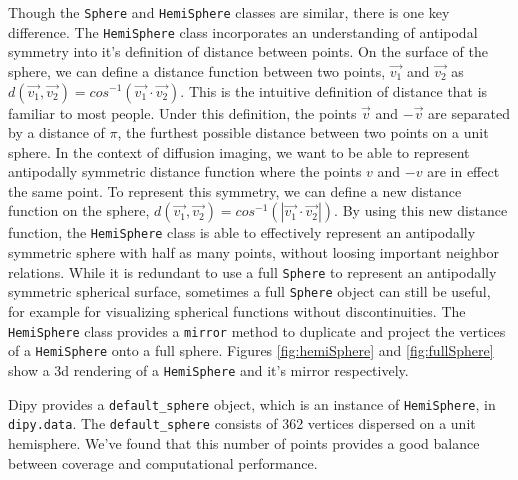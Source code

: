 Though the \verb|Sphere| and \verb|HemiSphere| classes are similar, there is one key difference. The \verb|HemiSphere| class incorporates an understanding of antipodal symmetry into it's definition of distance between points. On the surface of the sphere, we can define a distance function between two points, $\vec{v_1}$ and $\vec{v_2}$ as $d(\vec{v_1}, \vec{v_2}) = cos^{-1}(\vec{v_1} \cdot \vec{v_2})$. This is the intuitive definition of distance that is familiar to most people. Under this definition, the points $\vec{v}$ and $-\vec{v}$ are separated by a distance of $\pi$, the furthest possible distance between two points on a unit sphere. In the context of diffusion imaging, we want to be able to represent antipodally symmetric distance function where the points $v$ and $-v$ are in effect the same point. To represent this symmetry, we can define a new distance function on the sphere, $d(\vec{v_1}, \vec{v_2}) = cos^{-1}(|\vec{v_1} \cdot \vec{v_2}|)$. By using this new distance function, the \verb|HemiSphere| class is able to effectively represent an antipodally symmetric sphere with half as many points, without loosing important neighbor relations. While it is redundant to use a full \verb|Sphere| to represent an antipodally symmetric spherical surface, sometimes a full \verb|Sphere| object can still be useful, for example for visualizing spherical functions without discontinuities. The \verb|HemiSphere| class provides a \verb|mirror| method to duplicate and project the vertices of a \verb|HemiSphere| onto a full sphere. Figures \ref{fig:hemiSphere} and \ref{fig:fullSphere} show a 3d rendering of a \verb|HemiSphere| and it's mirror respectively.

Dipy provides a \verb|default_sphere| object, which is an instance of \verb|HemiSphere|, in \verb|dipy.data|. The \verb|default_sphere| consists of 362 vertices dispersed on a unit hemisphere. We've found that this number of points provides a good balance between coverage and computational performance.